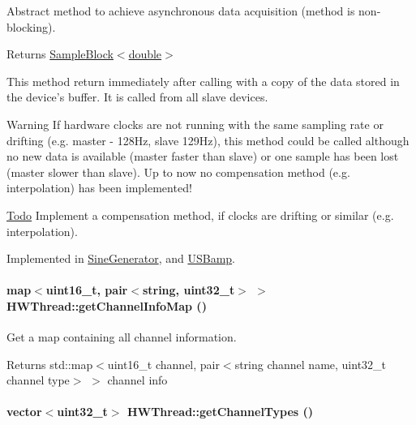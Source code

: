 Abstract method to achieve asynchronous data acquisition (method is non-\/blocking). \begin{DoxyReturn}{Returns}
\hyperlink{class_sample_block}{SampleBlock$<$double$>$}
\end{DoxyReturn}
This method return immediately after calling with a copy of the data stored in the device's buffer. It is called from all slave devices. \begin{DoxyWarning}{Warning}
If hardware clocks are not running with the same sampling rate or drifting (e.g. master -\/ 128Hz, slave 129Hz), this method could be called although no new data is available (master faster than slave) or one sample has been lost (master slower than slave). Up to now no compensation method (e.g. interpolation) has been implemented! 
\end{DoxyWarning}
\begin{Desc}
\item[\hyperlink{todo__todo000009}{Todo}]Implement a compensation method, if clocks are drifting or similar (e.g. interpolation). \end{Desc}


Implemented in \hyperlink{class_sine_generator_ad609b16d89e1d1c762cd94023ea41439}{SineGenerator}, and \hyperlink{class_u_s_bamp_a645a210ffbc5931560f91c8ee6896300}{USBamp}.\hypertarget{class_h_w_thread_a7ea386811b40278f26d54eef9c700c08}{
\paragraph[{getChannelInfoMap}]{\setlength{\rightskip}{0pt plus 5cm}map$<$uint16\_\-t, pair$<$string, uint32\_\-t$>$ $>$ HWThread::getChannelInfoMap ()}\hfill}
\label{class_h_w_thread_a7ea386811b40278f26d54eef9c700c08}


Get a map containing all channel information. \begin{DoxyReturn}{Returns}
std::map$<$uint16\_\-t channel, pair$<$string channel name, uint32\_\-t channel type$>$ $>$ channel info 
\end{DoxyReturn}
\hypertarget{class_h_w_thread_a655f5d40b6ae44cd59db936df49a5c07}{
\paragraph[{getChannelTypes}]{\setlength{\rightskip}{0pt plus 5cm}vector$<$uint32\_\-t$>$ HWThread::getChannelTypes ()}\hfill}
\label{class_h_w_thread_a655f5d40b6ae44cd59db936df49a5c07}


